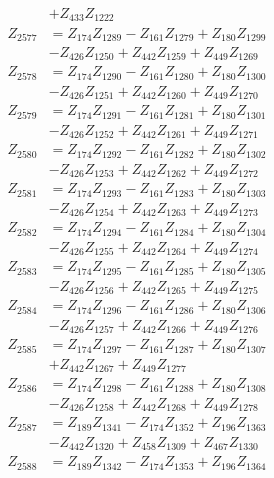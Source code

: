 \begin{multicols}{2}
\begin{align}
&+ Z_{433}Z_{1222} \nonumber \\
Z_{2577} &= Z_{174}Z_{1289} - Z_{161}Z_{1279} + Z_{180}Z_{1299}  \nonumber \\
&- Z_{426}Z_{1250} + Z_{442}Z_{1259} + Z_{449}Z_{1269} \nonumber \\
Z_{2578} &= Z_{174}Z_{1290} - Z_{161}Z_{1280} + Z_{180}Z_{1300}  \nonumber \\
&- Z_{426}Z_{1251} + Z_{442}Z_{1260} + Z_{449}Z_{1270} \nonumber \\
Z_{2579} &= Z_{174}Z_{1291} - Z_{161}Z_{1281} + Z_{180}Z_{1301}  \nonumber \\
&- Z_{426}Z_{1252} + Z_{442}Z_{1261} + Z_{449}Z_{1271} \nonumber \\
Z_{2580} &= Z_{174}Z_{1292} - Z_{161}Z_{1282} + Z_{180}Z_{1302}  \nonumber \\
&- Z_{426}Z_{1253} + Z_{442}Z_{1262} + Z_{449}Z_{1272} \nonumber \\
Z_{2581} &= Z_{174}Z_{1293} - Z_{161}Z_{1283} + Z_{180}Z_{1303}  \nonumber \\
&- Z_{426}Z_{1254} + Z_{442}Z_{1263} + Z_{449}Z_{1273} \nonumber \\
Z_{2582} &= Z_{174}Z_{1294} - Z_{161}Z_{1284} + Z_{180}Z_{1304}  \nonumber \\
&- Z_{426}Z_{1255} + Z_{442}Z_{1264} + Z_{449}Z_{1274} \nonumber \\
Z_{2583} &= Z_{174}Z_{1295} - Z_{161}Z_{1285} + Z_{180}Z_{1305}  \nonumber \\
&- Z_{426}Z_{1256} + Z_{442}Z_{1265} + Z_{449}Z_{1275} \nonumber \\
Z_{2584} &= Z_{174}Z_{1296} - Z_{161}Z_{1286} + Z_{180}Z_{1306}  \nonumber \\
&- Z_{426}Z_{1257} + Z_{442}Z_{1266} + Z_{449}Z_{1276} \nonumber \\
Z_{2585} &= Z_{174}Z_{1297} - Z_{161}Z_{1287} + Z_{180}Z_{1307}  \nonumber \\
&+ Z_{442}Z_{1267} + Z_{449}Z_{1277} \nonumber \\
Z_{2586} &= Z_{174}Z_{1298} - Z_{161}Z_{1288} + Z_{180}Z_{1308}  \nonumber \\
&- Z_{426}Z_{1258} + Z_{442}Z_{1268} + Z_{449}Z_{1278} \nonumber \\
Z_{2587} &= Z_{189}Z_{1341} - Z_{174}Z_{1352} + Z_{196}Z_{1363}  \nonumber \\
&- Z_{442}Z_{1320} + Z_{458}Z_{1309} + Z_{467}Z_{1330} \nonumber \\
Z_{2588} &= Z_{189}Z_{1342} - Z_{174}Z_{1353} + Z_{196}Z_{1364}  \nonumber \\

\end{align}
\end{multicols}
